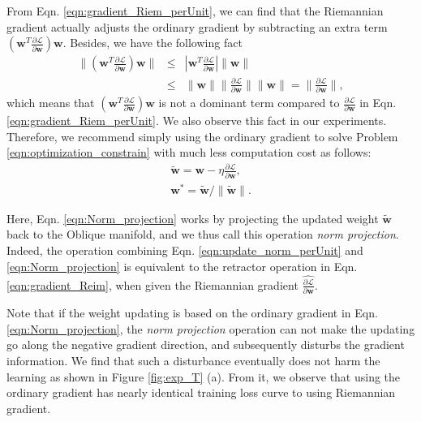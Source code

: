 \documentclass[twocolumn]{article}
\begin{document}
From Eqn. \ref{eqn:gradient_Riem_perUnit}, we can find that the Riemannian gradient actually adjusts the ordinary gradient by subtracting an extra term $(\mathbf{w}^T \frac{\partial \mathcal{L} }{\partial \mathbf{w}}) \mathbf{w}$. Besides, we have the following fact
\begin{eqnarray}
\| (\mathbf{w}^T \frac{\partial \mathcal{L} }{\partial \mathbf{w}}) \mathbf{w} \| & \leq & |\mathbf{w}^T \frac{\partial \mathcal{L} }{\partial \mathbf{w}}| \| \mathbf{w} \| \nonumber \\
&\leq&  \| \mathbf{w} \| \| \frac{\partial \mathcal{L} }{\partial \mathbf{w}} \| \| \mathbf{w} \|
 = \| \frac{\partial \mathcal{L} }{\partial \mathbf{w}} \|,
\end{eqnarray}
which means that $(\mathbf{w}^T \frac{\partial \mathcal{L} }{\partial \mathbf{w}}) \mathbf{w}$ is not a dominant term compared to $\frac{\partial \mathcal{L} }{\partial \mathbf{w}}$ in Eqn. \ref{eqn:gradient_Riem_perUnit}. We also observe this fact  in our experiments. Therefore, we recommend simply using the ordinary gradient to solve Problem \ref{eqn:optimization_constrain} with much less computation cost as follows:
 \begin{eqnarray}
 \label{eqn:update_norm_perUnit}
   \tilde{\mathbf{w}}=\mathbf{w}- \eta \frac{\partial \mathcal{L} }{\partial \mathbf{w}},\\
  \label{eqn:Norm_projection}
   \mathbf{w}^*= \tilde{\mathbf{w}}/ \| \tilde{\mathbf{w}} \|.
\end{eqnarray}

Here, Eqn. \ref{eqn:Norm_projection} works by projecting the updated weight $\tilde{\mathbf{w}}$ back to the Oblique manifold, and we thus call this operation \emph{norm projection}. Indeed, the operation combining Eqn. \ref{eqn:update_norm_perUnit} and \ref{eqn:Norm_projection} is equivalent to the retractor operation in Eqn. \ref{eqn:gradient_Reim}, when given the Riemannian gradient $\widehat{\frac{\partial \mathcal{L} }{\partial \mathbf{w}}}$.

Note that if the weight updating is based on the ordinary gradient in Eqn. \ref{eqn:Norm_projection}, the \emph{norm projection} operation can not make the updating go along the negative gradient direction, and subsequently disturbs the gradient information. We find that such a disturbance eventually does not harm the learning as shown in Figure \ref{fig:exp_T} (a). From it, we observe that using the ordinary gradient has nearly identical training loss curve to using Riemannian gradient.
\end{document}

